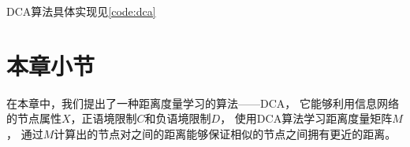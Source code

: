 DCA算法具体实现见\ref{code:dca}


\section{本章小节}

在本章中，我们提出了一种距离度量学习的算法——DCA，
它能够利用信息网络的节点属性$X$，正语境限制$C$和负语境限制$D$，
使用DCA算法学习距离度量矩阵$M$，
通过$M$计算出的节点对之间的距离能够保证相似的节点之间拥有更近的距离。

